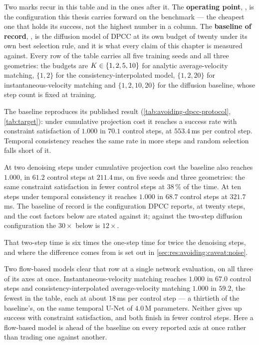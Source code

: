 Two marks recur in this table and in the ones after it. The \textbf{operating point}, \selectedmark, is
the configuration this thesis carries forward on the benchmark --- the cheapest one that holds its
success, not the highest number in a column. The \textbf{baseline of record}, \baselinemark, is the
diffusion model of \ac{DPCC} at its own budget of twenty under its own best selection rule, and it is
what every claim of this chapter is measured against. Every row of the table carries all five training
seeds and all three geometries: the budgets are $K\in\{1,2,5,10\}$ for analytic average-velocity
matching, $\{1,2\}$ for the consistency-interpolated model, $\{1,2,20\}$ for instantaneous-velocity
matching and $\{1,2,10,20\}$ for the diffusion baseline, whose step count is fixed at training.

The baseline reproduces its published result (\autoref{tab:avoiding-dpcc-protocol},
\autoref{tab:target}): under cumulative projection cost it reaches a success rate with constraint
satisfaction of $1.000$ in $70.1$ control steps, at $553.4$\,ms per control step. Temporal consistency
reaches the same rate in more steps and random selection falls short of it.

At two denoising steps under cumulative projection cost the baseline also reaches $1.000$, in $61.2$
control steps at $211.4$\,ms, on five seeds and three geometries: the same constraint satisfaction in
fewer control steps at $38\,\%$ of the time. At ten steps under temporal consistency it reaches $1.000$
in $68.7$ control steps at $321.7$\,ms. The baseline of record is
the configuration \ac{DPCC} reports, at twenty steps, and the cost factors below are stated against it;
against the two-step diffusion configuration the $30\times$ below is $12\times$.

That two-step time is six times the one-step time for twice the denoising steps, and where the
difference comes from is set out in \autoref{sec:res:avoiding:caveat:noise}.

Two flow-based models clear that row at a single network evaluation, on all three of its axes at once.
Instantaneous-velocity matching reaches $1.000$ in $67.0$ control steps and consistency-interpolated
average-velocity matching $1.000$ in $59.2$, the fewest in the table, each at about $18$\,ms per control
step --- a thirtieth of the baseline's, on the same temporal U-Net of $4.0$\,M parameters. Neither gives
up success with constraint satisfaction, and both finish in fewer control steps. Here a flow-based model
is ahead of the baseline on every reported axis at once rather than trading one against another.

